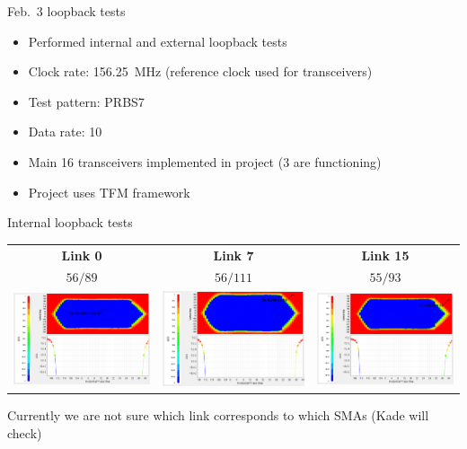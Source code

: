 \documentclass[aspectratio=169]{beamer}
\begin{document}
\begin{frame}{Feb.~3 loopback tests}

	\begin{itemize}
		\item Performed internal and external loopback tests \\[.5cm]
		\item Clock rate: \SI{156.25}{\mega\hertz} (reference clock used for transceivers) \\[.5cm]
		\item Test pattern: PRBS7 \\[.5cm]
		\item Data rate: \SI{10}{\Gbps} \\[.5cm]
		\item Main 16 transceivers implemented in project (3 are functioning) \\[.5cm]
		\item Project uses TFM framework
	\end{itemize}

\end{frame}


\begin{frame}{Internal loopback tests}
\centering

	\begin{tabular}{c c c}
		\textbf{Link 0} & \textbf{Link 7} & \textbf{Link 15} \\[.25cm]
		$56 / 89$ & $56 / 111$ & $55 / 93$ \\[.25cm]
		\includegraphics[width=.3\textwidth]{fig/2021-02-15_10g_prbs7_link0_lb.png} &
		\includegraphics[width=.3\textwidth]{fig/2021-02-15_10g_prbs7_link7_lb.png} &
		\includegraphics[width=.3\textwidth]{fig/2021-02-15_10g_prbs7_link15_lb.png}
	\end{tabular}
	
	\vspace{0.5cm}
	
	Currently we are not sure which link corresponds to which SMAs (Kade will check)

\end{frame}
\end{document}
